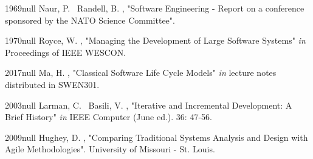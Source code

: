 \documentclass{CRPITStyle}
\begin{document}
\begin{thebibliography}{xx}

  	{1969}{null}
	Naur, P. \harvardand\ Randell, B.  \harvardyearright , "Software Engineering - Report on a conference sponsored by the NATO Science Committee".
	
	\harvarditem{[Royce]}
	{1970}{null}
	Royce, W. \harvardyearright, "Managing the Development of Large Software Systems" {\em in} Proceedings of IEEE WESCON.

	\harvarditem{[Ma]}
	{2017}{null}
	Ma, H. \harvardyearright, "Classical Software Life Cycle Models" {\em in} lecture notes distributed in SWEN301.
	
	\harvarditem{[Larman]}
	{2003}{null}
	Larman, C. \harvardand\ Basili, V. \harvardyearright, "Iterative and Incremental Development: A Brief History" {\em in} IEEE Computer (June ed.). 36:
	47-56.
	
	\harvarditem{[Hughey]}
	{2009}{null}
	Hughey, D. \harvardyearright, "Comparing Traditional Systems Analysis and Design with Agile Methodologies". University of
	Missouri - St. Louis.

\end{thebibliography}
		
\end{document}
